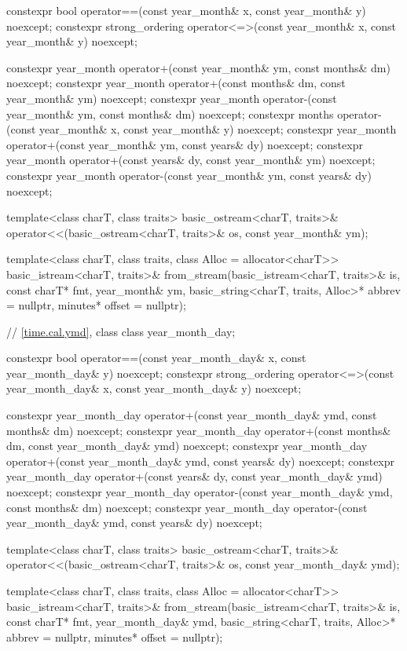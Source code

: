 \begin{codeblock}
{  constexpr bool operator==(const year_month& x, const year_month& y) noexcept;
  constexpr strong_ordering operator<=>(const year_month& x, const year_month& y) noexcept;

  constexpr year_month operator+(const year_month& ym, const months& dm) noexcept;
  constexpr year_month operator+(const months& dm, const year_month& ym) noexcept;
  constexpr year_month operator-(const year_month& ym, const months& dm) noexcept;
  constexpr months operator-(const year_month& x, const year_month& y) noexcept;
  constexpr year_month operator+(const year_month& ym, const years& dy) noexcept;
  constexpr year_month operator+(const years& dy, const year_month& ym) noexcept;
  constexpr year_month operator-(const year_month& ym, const years& dy) noexcept;

  template<class charT, class traits>
    basic_ostream<charT, traits>&
      operator<<(basic_ostream<charT, traits>& os, const year_month& ym);

  template<class charT, class traits, class Alloc = allocator<charT>>
    basic_istream<charT, traits>&
      from_stream(basic_istream<charT, traits>& is, const charT* fmt,
                  year_month& ym, basic_string<charT, traits, Alloc>* abbrev = nullptr,
                  minutes* offset = nullptr);

  // \ref{time.cal.ymd}, class 
  class year_month_day;

  constexpr bool operator==(const year_month_day& x, const year_month_day& y) noexcept;
  constexpr strong_ordering operator<=>(const year_month_day& x,
                                        const year_month_day& y) noexcept;

  constexpr year_month_day operator+(const year_month_day& ymd, const months& dm) noexcept;
  constexpr year_month_day operator+(const months& dm, const year_month_day& ymd) noexcept;
  constexpr year_month_day operator+(const year_month_day& ymd, const years& dy) noexcept;
  constexpr year_month_day operator+(const years& dy, const year_month_day& ymd) noexcept;
  constexpr year_month_day operator-(const year_month_day& ymd, const months& dm) noexcept;
  constexpr year_month_day operator-(const year_month_day& ymd, const years& dy) noexcept;

  template<class charT, class traits>
    basic_ostream<charT, traits>&
      operator<<(basic_ostream<charT, traits>& os, const year_month_day& ymd);

  template<class charT, class traits, class Alloc = allocator<charT>>
    basic_istream<charT, traits>&
      from_stream(basic_istream<charT, traits>& is, const charT* fmt,
                  year_month_day& ymd,
                  basic_string<charT, traits, Alloc>* abbrev = nullptr,
                  minutes* offset = nullptr);

}
\end{codeblock}
